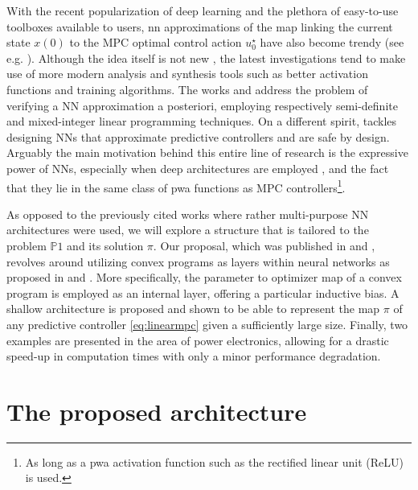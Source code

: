 With the recent popularization of deep learning and the plethora of easy-to-use toolboxes available to users, \ac{nn} approximations of the map linking the current state $x(0)$ to the MPC optimal control action $u_0^\star$ have also become trendy (see e.g. \cite{karg2020efficient,kumar2021industrial}). Although the idea itself is not new \citep{parisini1995receding}, the latest investigations tend to make use of more modern analysis and synthesis tools such as better activation functions and training algorithms. The works \cite{fazlyab2020safety} and \cite{schwan2022stability} address the problem of verifying a NN approximation a posteriori, employing respectively semi-definite and mixed-integer linear programming techniques. On a different spirit, \cite{paulson2020approximate} tackles designing NNs that approximate predictive controllers and are safe by design. Arguably the main motivation behind this entire line of research is the expressive power of NNs, especially when deep architectures are employed \cite{karg2020efficient}, and the fact that they lie in the same class of \ac{pwa} functions as MPC controllers\footnote{As long as a \ac{pwa} activation function such as the rectified linear unit (ReLU) is used.}.

As opposed to the previously cited works where rather multi-purpose NN architectures were used, we will explore a structure that is tailored to the problem $\mathds{P}1$ and its solution $\pi$. Our proposal, which was published in \cite{maddalena2020neural} and \cite{maddalena2021embedded}, revolves around utilizing convex programs as layers within neural networks as proposed in \cite{amos2017optnet} and \cite{agrawal2019differentiable}. More specifically, the parameter to optimizer map of a convex program is employed as an internal layer, offering a particular inductive bias. A shallow architecture is proposed and shown to be able to represent the map $\pi$ of any predictive controller \eqref{eq:linearmpc} given a sufficiently large size. Finally, two examples are presented in the area of power electronics, allowing for a drastic speed-up in computation times with only a minor performance degradation.
	
\section{The proposed architecture}

